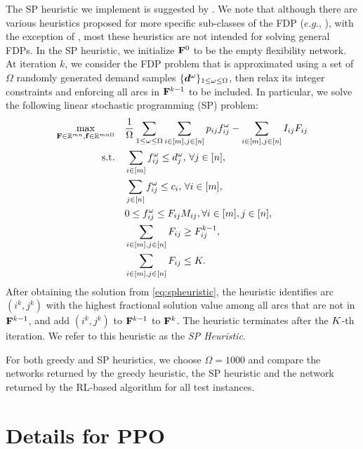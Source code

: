 \documentclass{article} %
\begin{document}
The SP heuristic we implement is suggested by \citet{feng2017process}. We note that although there are various heuristics proposed for more specific sub-classes of the FDP ($e.g.$, \citet{Chou2010, Chou2011, simchi2015worst}), with the exception of \citet{feng2017process}, most these heuristics are not intended for solving general FDPs. 
In the SP heuristic, we initialize $\mathbf{F}^0$ to be the empty flexibility network. At iteration $k$, we consider the FDP problem that is approximated using a set of $\Omega$ randomly generated demand samples $\{\boldsymbol{d}^\omega\}_{1 \leq \omega \leq \Omega}$, then relax its integer constraints and enforcing all arcs in $\mathbf{F}^{k-1}$ to be included. In particular, we solve the
following linear stochastic programming (SP) problem:
\begin{align}
\max_{\mathbf{F}\in \mathbb{R}^{m n},  \mathbf{f}\in \mathbb{R}^{mn\Omega}} \quad  & \frac{1}{\Omega}\sum_{1\leq \omega \leq \Omega}\sum_{i \in [m],j \in [n]}p_{ij}f^\omega_{ij} - \sum_{i \in [m],j \in [n]} I_{ij}F_{ij} \label{eq:spheuristic}\\
\quad \mbox{s.t.} \quad & \sum_{i \in [m]}f^\omega_{ij} \leq d^\omega_j, \, \forall j \in [n], \nonumber \\
\quad & \sum_{j \in [n]}f^\omega_{ij} \leq c_i, \, \forall i \in [m], \nonumber \\
\quad & 0 \leq f^\omega_{ij} \leq F_{ij}M_{ij} , \forall i\in[m], j\in[n], \nonumber \\
\quad & \sum_{i \in [m],j \in [n]} F_{ij} \geq F^{k-1}_{ij},\nonumber \\
\quad & \sum_{i \in [m],j \in [n]} F_{ij} \leq K.\nonumber
\end{align}
After obtaining the solution from \eqref{eq:spheuristic}, 
the heuristic identifies arc $(i^k, j^k)$ with the highest fractional solution value among all arcs that are not in $\mathbf{F}^{k-1}$, and add $(i^k, j^k)$ to $\mathbf{F}^{k-1}$ to $\mathbf{F}^k$. The heuristic terminates after the $K$-th iteration. We refer to this heuristic as the \emph{SP Heuristic}.

For both greedy and SP heuristics, we choose $\Omega=1000$ and compare the networks returned by the greedy heuristic, the SP heuristic and the network returned by the RL-based algorithm for all test instances. 

\section{Details for PPO}\label{sec:ppodetail}
\end{document}
